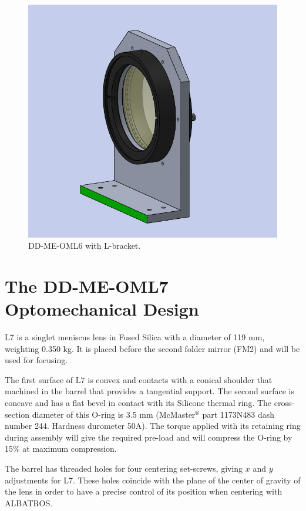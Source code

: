 \documentclass{report}
\begin{document}
\begin{figure}
\begin{center}
\includegraphics[width=0.7\linewidth]{figures/DD-OML6-LBr.jpg}
\end{center}
\caption{DD-ME-OML6 with L-bracket.}
\label{figure:WOB-OML6-LBr}
\end{figure}

\section{The DD-ME-OML7 Optomechanical Design}

L7 is a singlet meniscus lens in Fused Silica with a diameter of 119 mm, weighting 0.350 kg. It is placed before the second folder mirror (FM2) and will be used for focusing.

The first surface of L7 is convex and contacts with a conical shoulder that machined in the barrel that provides a tangential support. The second surface is concave and has a flat bevel in contact with its Silicone thermal ring. The cross-section diameter of this O-ring is 3.5 mm (McMaster${}^\circledR$ part 1173N483 dash number 244. Hardness durometer 50A). The torque applied with its retaining ring during assembly will give the required pre-load and will compress the O-ring by 15\% at maximum compression.

The barrel has threaded holes for four centering set-screws, giving $x$ and $y$ adjustments for L7. These holes coincide with the plane of the center of gravity of the lens in order to have a precise control of its position when centering with ALBATROS.
\end{document}
